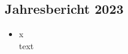 \subsection{Jahresbericht 2023}
\begin{history}


    \begin{itemize}

        \item[]x\\
        text

    \end{itemize}

\end{history}
